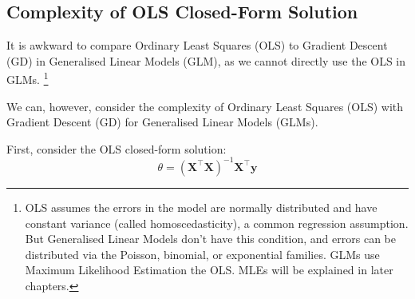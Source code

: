 \newpage
\subsection{Complexity of OLS Closed-Form Solution}
It is awkward to compare Ordinary Least Squares (OLS) to Gradient Descent (GD) in Generalised Linear Models (GLM), as we cannot directly use the OLS in GLMs. \footnote{OLS assumes the errors in the model are normally distributed and have constant variance (called homoscedasticity), a common regression assumption. But Generalised Linear Models don't have this condition, and errors can be distributed via the Poisson, binomial, or exponential families. GLMs use Maximum Likelihood Estimation the OLS. MLEs will be explained in later chapters. } \bigskip

We can, however, consider the complexity of Ordinary Least Squares (OLS) with Gradient Descent (GD) for Generalised Linear Models (GLMs). \bigskip


First, consider the OLS closed-form solution:
\[
    \theta = (\bm{X}^\top \bm{X})^{-1} \bm{X}^\top \bm{y}
\]


